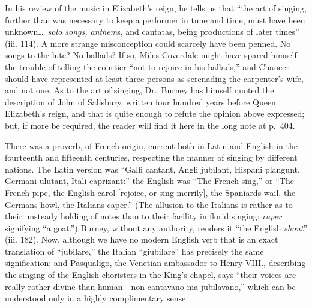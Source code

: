  
In his review of the music in Elizabeth’s reign, he tells us that “the art of
singing, further than was necessary to keep a performer in tune and time, must
have been unknown\ldots\  \textit{solo songs, anthem}s, and cantatas, being productions of
later times” (iii. 114). A more strange misconception could scarcely have been
penned. No songs to the lute? No ballads? If so, Miles Coverdale might have
spared himself the trouble of telling the courtier “not to rejoice in his ballads,” 
and Chaucer should have represented \pagebreak
at least three persons as serenading the
carpenter's wife, and not  one. As to the art of singing, Dr.~Burney has himself 
quoted the description of John of Salisbury, written four hundred years before
Queen Elizabeth’s reign, and that is quite enough to refute the opinion above
expressed; but, if more be required, the reader will find it here in the long note
at p.~404.

There was a proverb, of French origin, current both in Latin and English in
the fourteenth and fifteenth centuries, respecting the manner of singing by different
nations. The Latin version was “Galli cantant, Angli jubilant, Hispani
plangunt, Germani ulutant, Itali caprizant:” the English was “The French
sing,” or “The French pipe, the English carol [rejoice, or sing merrily], the
Spaniards wail, the Germans howl, the Italians caper.” (The allusion to the
Italians is rather as to their unsteady holding of notes than to their facility in
florid singing; \textit{caper} signifying “a goat.”) Burney, without any authority,
renders it “the English \textit{shout}” (iii. 182). Now, although we have no modern
English verb that is an exact translation of “jubilare,” the Italian “giubilare”
has precisely the same signification; and Pasqualigo, the Venetian ambassador
to Henry VIII., describing the singing of the English choristers in the King’s
chapel, says “their voices are really rather divine than human—non cantavano
ma jubilavano,” which can be understood only in a highly complimentary sense.

